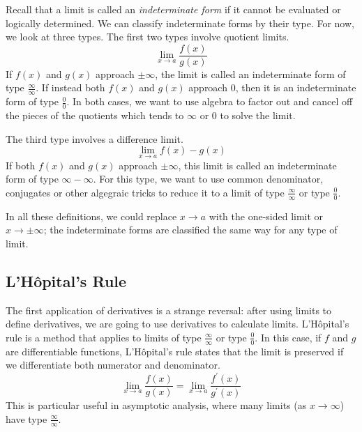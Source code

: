 \documentclass[fleqn]{report}
\begin{document}
Recall that a limit is called an \emph{indeterminate form} if
it cannot be evaluated or logically determined. We can
classify indeterminate forms by their type. For now, we look
at three types. The first two types involve quotient limits.
\begin{equation*}
\lim_{x \rightarrow a} \frac{f(x)}{g(x)}
\end{equation*}
If $f(x)$ and $g(x)$ approach $\pm \infty$, the limit is called
an indeterminate form of type $\frac{\infty}{\infty}$. If
instead both $f(x)$ and $g(x)$ approach $0$, then it is an
indeterminate form of type $\frac{0}{0}$. In both cases, we
want to use algebra to factor out and cancel off the pieces of
the quotients which tends to $\infty$ or $0$ to solve the
limit.

The third type involves a difference limit.
\begin{equation*}
\lim_{x \rightarrow a} f(x) - g(x)
\end{equation*}
If both $f(x)$ and $g(x)$ approach $\pm \infty$, this limit is
called an indeterminate form of type $\infty - \infty$. For
this type, we want to use common denominator, conjugates or
other algegraic tricks to reduce it to a limit of type
$\frac{\infty}{\infty}$ or type $\frac{0}{0}$.

In all these definitions, we could replace $x \rightarrow a$
with the one-sided limit or $x \rightarrow \pm \infty$; the
indeterminate forms are classified the same way for any type
of limit.

\subsection{L'H\^opital's Rule}
\label{h-rule-definition}

The first application of derivatives is a strange reversal:
after using limits to define derivatives, we are going to use
derivatives to calculate limits.  L'H\^opital's rule is a
method that applies to limits of type $\frac{\infty}{\infty}$
or type $\frac{0}{0}$. In this case, if $f$ and $g$ are
differentiable functions, L'H\^opital's rule states that the
limit is preserved if we differentiate both numerator and
denominator.
\begin{equation*}
\lim_{x \rightarrow a} \frac{f(x)}{g(x)} = 
\lim_{x \rightarrow a} \frac{f^\prime(x)}{g^\prime(x)} 
\end{equation*}
This is particular useful in asymptotic analysis, where many
limits (as $x \rightarrow \infty$) have type
$\frac{\infty}{\infty}$. 
\end{document}

